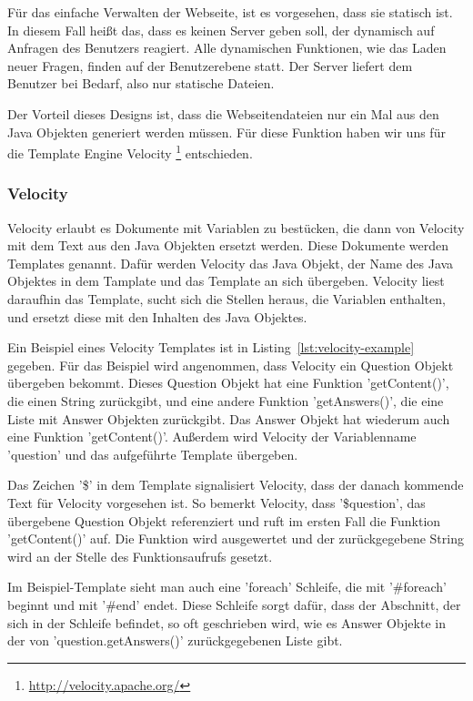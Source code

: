 \label{Sokol}
Für das einfache Verwalten der Webseite, ist es vorgesehen, dass sie statisch ist.
In diesem Fall heißt das, dass es keinen Server geben soll, der dynamisch auf Anfragen des Benutzers reagiert.
Alle dynamischen Funktionen, wie das Laden neuer Fragen, finden auf der Benutzerebene statt.
Der Server liefert dem Benutzer bei Bedarf, also nur statische Dateien.

Der Vorteil dieses Designs ist, dass die Webseitendateien nur ein Mal aus den Java Objekten generiert werden müssen.
Für diese Funktion haben wir uns für die Template Engine Velocity \footnote{\url{http://velocity.apache.org/}} entschieden.

\subsubsection{Velocity}

Velocity erlaubt es Dokumente mit Variablen zu bestücken, die dann von Velocity mit dem Text aus den Java Objekten ersetzt werden.
Diese Dokumente werden Templates genannt.
Dafür werden Velocity das Java Objekt, der Name des Java Objektes in dem Tamplate und das Template an sich übergeben.
Velocity liest daraufhin das Template, sucht sich die Stellen heraus, die Variablen enthalten, und ersetzt diese mit den Inhalten des Java Objektes.

Ein Beispiel eines Velocity Templates ist in Listing~\ref{lst:velocity-example} gegeben.
Für das Beispiel wird angenommen, dass Velocity ein Question Objekt übergeben bekommt.
Dieses Question Objekt hat eine Funktion 'getContent()', die einen String zurückgibt, und eine andere Funktion 'getAnswers()', die eine Liste mit Answer Objekten zurückgibt.
Das Answer Objekt hat wiederum auch eine Funktion 'getContent()'.
Außerdem wird Velocity der Variablenname 'question' und das aufgeführte Template übergeben.

Das Zeichen '\$' in dem Template signalisiert Velocity, dass der danach kommende Text für Velocity vorgesehen ist.
So bemerkt Velocity, dass '\$question', das übergebene Question Objekt referenziert und ruft im ersten Fall die Funktion 'getContent()' auf.
Die Funktion wird ausgewertet und der zurückgegebene String wird an der Stelle des Funktionsaufrufs gesetzt.

Im Beispiel-Template sieht man auch eine 'foreach' Schleife, die mit '\#foreach' beginnt und mit '\#end' endet.
Diese Schleife sorgt dafür, dass der Abschnitt, der sich in der Schleife befindet, so oft geschrieben wird, wie es Answer Objekte in der von 'question.getAnswers()' zurückgegebenen Liste gibt.

